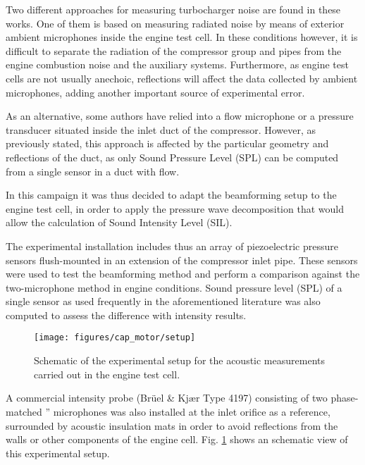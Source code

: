 Two different approaches for measuring turbocharger noise are found  in these works. One of them is based on measuring radiated noise by means of exterior ambient microphones inside the engine test cell. In these conditions however, it is difficult to separate the radiation of the compressor group and pipes from the engine combustion noise and the auxiliary systems. Furthermore, as engine test cells are not usually anechoic, reflections will affect the data collected by ambient microphones, adding another important source of experimental error.

As an alternative, some authors have relied into a flow microphone or a pressure transducer situated inside the inlet duct of the compressor. However, as previously stated, this approach is affected by the particular geometry and reflections of the duct, as only Sound Pressure Level (SPL) can be computed from a single sensor in a duct with flow.

In this campaign it was thus decided to adapt the beamforming setup to the engine test cell, in order to apply the pressure wave decomposition that would allow the calculation of Sound Intensity Level (SIL).

The experimental installation includes thus an array of piezoelectric pressure sensors flush-mounted in an extension of the compressor inlet pipe. These sensors were used to test the beamforming method and perform a comparison against the two-microphone method in engine conditions. Sound pressure level (SPL) of a single sensor as used frequently in the aforementioned literature was also computed to assess the difference with intensity results.

\begin{figure}[t!]
\centering
\null\hspace{1cm}
\texttt{[image: figures/cap\_motor/setup]}
\null\hspace{1cm}
\caption{Schematic of the experimental setup for the acoustic measurements carried out in the engine test cell.}
\label{fig:setup}
\end{figure}

A commercial intensity probe (Brüel \& Kjær Type 4197) consisting of two phase-matched '' microphones was also installed at the inlet orifice as a reference, surrounded by acoustic insulation mats in order to avoid reflections from the walls or other components of the engine cell.  Fig. \ref{fig:setup} shows an schematic view of this  experimental setup.

